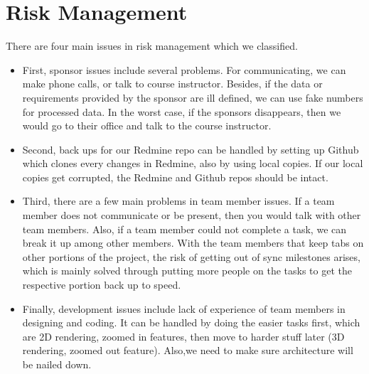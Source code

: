 \documentclass[12pt, letterpaper]{article}
\begin{document}
\section{Risk Management}
There are four main issues in risk management which we classified. 
\begin{itemize}
     \item First, sponsor issues include several problems. For communicating, we can make phone calls, or talk to course instructor. Besides, if the data or requirements provided by the sponsor are ill defined, we can use fake numbers for processed data. In the worst case, if the sponsors disappears, then we would go to their office and talk to the course instructor.
    \item Second, back ups for our Redmine repo can be handled by setting up Github which clones every changes in Redmine, also by using local copies. If our local copies get corrupted, the Redmine and Github repos should be intact.
    \item Third, there are a few main problems in team member issues. If a team member does not communicate or be present, then you would talk with other team members. Also, if a team member could not complete a task, we can break it up among other members. With the team members that keep tabs on other portions of the project, the risk of getting out of sync milestones arises, which is mainly solved through putting more people on the tasks to get the respective portion back up to speed.
	\item Finally, development issues include lack of experience of team members in designing and coding. It can be handled by doing the easier tasks first, which are 2D rendering, zoomed in features, then move to harder stuff later (3D rendering, zoomed out feature). Also,we need to make sure architecture will be nailed down.
\end{itemize}
\end{document}
